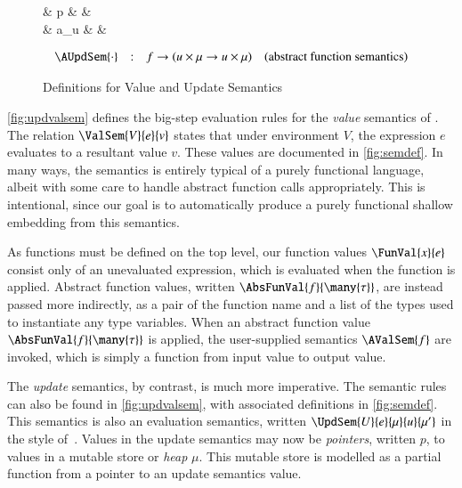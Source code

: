 \documentclass[9pt\ifFinal\else,preprint,nocopyrightspace\fi,\ifAlpha\else natbib,authoryear\fi]{sigplanconf}
\begin{document}
\begin{figure}
\begin{grammar}
             & p & &  \\
      & a_u & & 
    \\
  \end{grammar}
  \begin{displaymath}
   \begin{array}{lclr}
    \AUpdSem{\cdot} & : & f \rightarrow (u \times \mu \rightarrow u \times \mu) & \text{(abstract function semantics)}
   \end{array}
  \end{displaymath}
  \caption{Definitions for Value and Update Semantics}
  \label{fig:semdef}
\end{figure}
\autoref{fig:updvalsem} defines the big-step evaluation rules for the 
\emph{value} semantics of \CDSL. The relation
\mbox{$\ValSem{V}{e}{v}$} states that under
environment $V$, the expression $e$ evaluates to a resultant value
$v$. These values are documented in \autoref{fig:semdef}. In many
ways, the semantics is entirely typical of a purely functional
language, albeit with some care to handle abstract function calls
appropriately. This is intentional, since our goal is to automatically
produce a purely functional shallow embedding from this semantics.

As functions must be defined on the top level, our function values
$\FunVal{x}{e}$ consist only of an unevaluated expression, which is
evaluated when the function is applied. Abstract function values,
written $\AbsFunVal{f}{\many{\tau}}$, are instead passed more
indirectly, as a pair of the function name and a list of the types
used to instantiate any type variables.  When an abstract function
value $\AbsFunVal{f}{\many{\tau}}$ is applied, the user-supplied
semantics $\AValSem{f}$ are invoked, which is simply a function from
input value to output value.

The \emph{update} semantics, by contrast, is much more imperative. The
semantic rules can also be found in \autoref{fig:updvalsem}, with associated
definitions in
\autoref{fig:semdef}. This semantics is also an evaluation
semantics, written $\UpdSem{U}{e}{\mu}{u}{\mu'}$ in the style 
of~\citet{Pierce_02}. Values in the update semantics may now be 
\emph{pointers}, written $p$, to values in a mutable store or \emph{heap} $\mu$.  
This mutable store is modelled as a partial function from a pointer to 
an update semantics value. 
\end{document}
